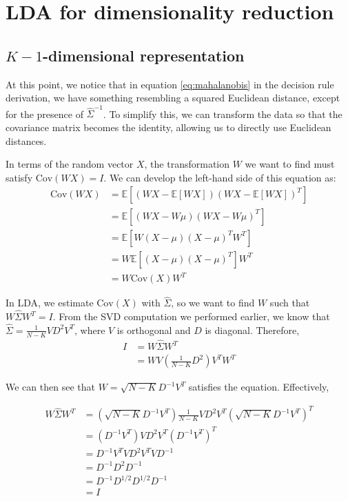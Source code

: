 \section{LDA for dimensionality reduction}

\subsection{$K-1$-dimensional representation}

At this point, we notice that in equation \ref{eq:mahalanobis} in the decision rule derivation, we have something resembling a squared Euclidean distance, except for the presence of $\hat{\Sigma}^{-1}$. To simplify this, we can transform the data so that the covariance matrix becomes the identity, allowing us to directly use Euclidean distances.

In terms of the random vector $X$, the transformation $W$ we want to find must satisfy $\text{Cov}(WX) = I$. We can develop the left-hand side of this equation as:
\begin{align}
\text{Cov}(WX) &= \mathbb{E}\left[ (WX - \mathbb{E}[WX])(WX - \mathbb{E}[WX])^T \right] \nonumber \\
&= \mathbb{E}\left[ (WX - W\mu)(WX - W\mu)^T \right] \nonumber \\
&= \mathbb{E}\left[ W(X - \mu)(X - \mu)^T W^T \right] \nonumber \\
&= W \mathbb{E}\left[ (X - \mu)(X - \mu)^T \right] W^T \nonumber \\
&= W \text{Cov}(X) W^T \label{eq:covariance-transformation}
\end{align}

In LDA, we estimate $\text{Cov}(X)$ with $\hat{\Sigma}$, so we want to find $W$ such that $W \hat{\Sigma} W^T = I$. From the SVD computation we performed earlier, we know that $\hat{\Sigma} = \frac{1}{N-K}VD^2V^T$, where $V$ is orthogonal and $D$ is diagonal. Therefore,
\begin{align*}
I & = W \hat{\Sigma} W^T \\
& = W V (\frac{1}{N-K}D^2) V^T W^T
\end{align*}

We can then see that $W = \sqrt{N-K}D^{-1}V^T$ satisfies the equation. Effectively,

\begin{align*}
W \hat{\Sigma} W^T &= (\sqrt{N-K}D^{-1}V^T) \frac{1}{N-K}VD^2V^T (\sqrt{N-K}D^{-1}V^T)^T \\
&= (D^{-1}V^T) VD^2V^T (D^{-1}V^T)^T \\
&= D^{-1}V^T VD^2V^T V D^{-1} \\
&= D^{-1}D^2 D^{-1} \\
&= D^{-1}D^{1/2} D^{1/2} D^{-1} \\
& = I
\end{align*}


